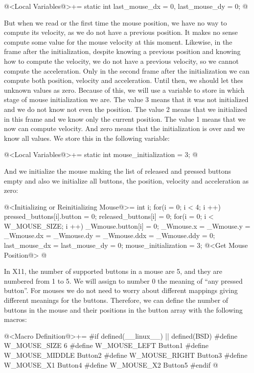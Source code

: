\iniciocodigo
@<Local Variables@>+=
static int last_mouse_dx = 0, last_mouse_dy = 0;
@
\fimcodigo

But when we read or the first time the mouse position, we have no way
to compute its velocity, as we do not have a previous position. It
makes no sense compute some value for the mouse velocity at this
moment. Likewise, in the frame after the initialization, despite
knowing a previous position and knowing how to compute the velocity,
we do not have a previous velocity, so we cannot compute the
acceleration. Only in the second frame after the initialization we can
compute both position, velocity and acceleration. Until then, we
should let thes unknown values as zero. Because of this, we will use a
variable to store in which stage of mouse initialization we are. The
value 3 means that it was not initialized and we do not know not even
the position. The value 2 means that we initialized in this frame and
we know only the current position. The value 1 means that we now can
compute velocity. And zero means that the initialization is over and
we know all values. We store this in the following variable:

\iniciocodigo
@<Local Variables@>+=
static int mouse_initialization = 3;
@
\fimcodigo


And we initialize the mouse making the list of released and pressed
buttons empty and also we initialize all buttons, the position,
velocity and acceleration as zero:

\iniciocodigo
@<Initializing or Reinitializing Mouse@>=
{
  int i;
  for(i = 0; i < 4; i ++){
    pressed_buttons[i].button = 0;
    released_buttons[i] = 0;
  }
  for(i = 0; i < W_MOUSE_SIZE; i ++)
    _Wmouse.button[i] = 0;
  _Wmouse.x = _Wmouse.y = _Wmouse.dx = _Wmouse.dy = _Wmouse.ddx = _Wmouse.ddy = 0;
  last_mouse_dx = last_mouse_dy = 0;
  mouse_initialization = 3;
  @<Get Mouse Position@>
}
@
\fimcodigo


In X11, the number of supported buttons in a mouse are 5, and they are
numbered from 1 to 5. We will assign to number 0 the meaning of ``any
pressed button''. For mouses we do not need to worry about different
mappings giving different meanings for the buttons. Therefore, we can
define the number of buttons in the mouse and their positions in the
button array with the following macros:

\iniciocodigo
@<Macro Definition@>+=
#if defined(__linux__) || defined(BSD)
#define W_MOUSE_SIZE 6
#define W_MOUSE_LEFT   Button1
#define W_MOUSE_MIDDLE Button2
#define W_MOUSE_RIGHT  Button3
#define W_MOUSE_X1     Button4
#define W_MOUSE_X2     Button5
#endif
@
\fimcodigo

